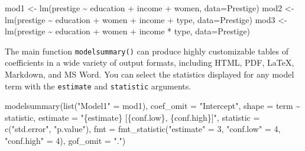 \documentclass[
  letterpaper,
  DIV=11,
  numbers=noendperiod]{scrartcl}
\newenvironment{Shaded}{\begin{snugshade}}{\end{snugshade}}
\newcommand{\AttributeTok}[1]{\textcolor[rgb]{0.40,0.45,0.13}{#1}}
\newcommand{\DecValTok}[1]{\textcolor[rgb]{0.68,0.00,0.00}{#1}}
\newcommand{\FunctionTok}[1]{\textcolor[rgb]{0.28,0.35,0.67}{#1}}
\newcommand{\NormalTok}[1]{\textcolor[rgb]{0.00,0.23,0.31}{#1}}
\newcommand{\OtherTok}[1]{\textcolor[rgb]{0.00,0.23,0.31}{#1}}
\newcommand{\SpecialCharTok}[1]{\textcolor[rgb]{0.37,0.37,0.37}{#1}}
\newcommand{\StringTok}[1]{\textcolor[rgb]{0.13,0.47,0.30}{#1}}
\begin{document}
\begin{Shaded}
\begin{Highlighting}[]
\NormalTok{mod1 }\OtherTok{\textless{}{-}} \FunctionTok{lm}\NormalTok{(prestige }\SpecialCharTok{\textasciitilde{}}\NormalTok{ education }\SpecialCharTok{+}\NormalTok{ income }\SpecialCharTok{+}\NormalTok{ women,}
           \AttributeTok{data=}\NormalTok{Prestige)}
\NormalTok{mod2 }\OtherTok{\textless{}{-}} \FunctionTok{lm}\NormalTok{(prestige }\SpecialCharTok{\textasciitilde{}}\NormalTok{ education }\SpecialCharTok{+}\NormalTok{ women }\SpecialCharTok{+}\NormalTok{ income }\SpecialCharTok{+}\NormalTok{ type,}
           \AttributeTok{data=}\NormalTok{Prestige)}
\NormalTok{mod3 }\OtherTok{\textless{}{-}} \FunctionTok{lm}\NormalTok{(prestige }\SpecialCharTok{\textasciitilde{}}\NormalTok{ education }\SpecialCharTok{+}\NormalTok{ women }\SpecialCharTok{+}\NormalTok{ income }\SpecialCharTok{*}\NormalTok{ type,}
           \AttributeTok{data=}\NormalTok{Prestige)}
\end{Highlighting}
\end{Shaded}

The main function \texttt{modelsummary()} can produce highly
customizable tables of coefficients in a wide variety of output formats,
including HTML, PDF, LaTeX, Markdown, and MS Word. You can select the
statistics displayed for any model term with the \texttt{estimate} and
\texttt{statistic} arguments.

\begin{Shaded}
\begin{Highlighting}[]
\FunctionTok{modelsummary}\NormalTok{(}\FunctionTok{list}\NormalTok{(}\StringTok{"Model1"} \OtherTok{=}\NormalTok{ mod1),}
  \AttributeTok{coef\_omit =} \StringTok{"Intercept"}\NormalTok{,}
  \AttributeTok{shape =}\NormalTok{ term }\SpecialCharTok{\textasciitilde{}}\NormalTok{ statistic,}
  \AttributeTok{estimate =} \StringTok{"\{estimate\} [\{conf.low\}, \{conf.high\}]"}\NormalTok{,}
  \AttributeTok{statistic =} \FunctionTok{c}\NormalTok{(}\StringTok{"std.error"}\NormalTok{, }\StringTok{"p.value"}\NormalTok{),}
  \AttributeTok{fmt =} \FunctionTok{fmt\_statistic}\NormalTok{(}\StringTok{"estimate"} \OtherTok{=} \DecValTok{3}\NormalTok{, }\StringTok{"conf.low"} \OtherTok{=} \DecValTok{4}\NormalTok{, }\StringTok{"conf.high"} \OtherTok{=} \DecValTok{4}\NormalTok{),}
  \AttributeTok{gof\_omit =} \StringTok{"."}\NormalTok{)}
\end{Highlighting}
\end{Shaded}
\end{document}
